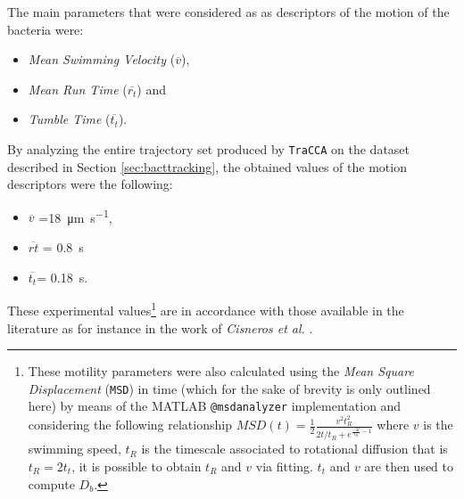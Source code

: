 The main parameters that were considered as as descriptors of the motion of the bacteria were: 
\begin{itemize}
\item \textit{Mean Swimming Velocity} ($\overline{v}$),
\item \textit{Mean Run Time} ($\overline{r_t}$) and 
\item \textit{Tumble Time} ($\overline{t_t}$).
\end{itemize}
By analyzing the entire trajectory set produced by \texttt{TraCCA} on the dataset described in Section \ref{sec:bacttracking}, the obtained values of the motion descriptors  were the following: 
\begin{itemize}
\item $\overline{v}$ =\SI{18}{\micro\meter \per \second},
\item $\overline{rt}$ = \SI{0.8}{\second}
\item $\overline{t_t}$= \SI{0.18}{\second}.
\end{itemize}
These experimental values\footnote{These motility parameters were also calculated using the \textit{Mean Square Displacement} (\texttt{MSD}) in time (which for the sake of brevity is only outlined here) by means of the MATLAB \texttt{@msdanalyzer} implementation \cite{msdanalyzer} and considering the following relationship $MSD(t)=\frac{1}{2}\frac{v^2 t_R^2}{2t/t_R +e^{\frac{-2t}{t_R}-1}}$ \cite{Howse2007} where $v$ is the swimming speed, $t_R$ is the timescale associated to rotational diffusion that is $t_R=2t_t$, it is possible to obtain $t_R $ and $v$ via fitting. $t_t$ and $v$ are then used to compute $D_b$.} are in accordance with those available in the literature as for instance in the work of \textit{Cisneros et al.} \cite{Cisneros:2011}.

